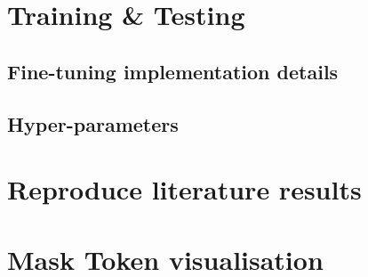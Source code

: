 \chapter{Training \& Testing}
\section{Fine-tuning implementation details} \label{sec:appendix-finetune}
\section{Hyper-parameters}


\chapter{Reproduce literature results} \label{sec:reprod_lit_res}
\chapter{Mask Token visualisation} \label{sec:appendix-visual}
